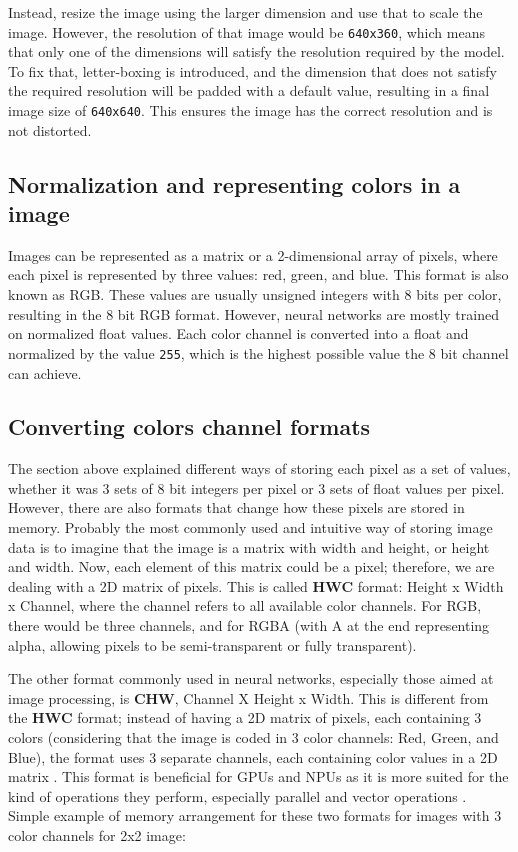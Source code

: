 Instead, resize the image using the larger dimension and use that to scale the image. However, the resolution of that image would be \texttt{640x360}, which means that only one of the dimensions will satisfy the resolution required by the model. To fix that, letter-boxing is introduced, and the dimension that does not satisfy the required resolution will be padded with a default value, resulting in a final image size of \texttt{640x640}. This ensures the image has the correct resolution and is not distorted.


\subsection{Normalization and representing colors in a image}
Images can be represented as a matrix or a 2-dimensional array of pixels, where each pixel is represented by three values: red, green, and blue. This format is also known as RGB. These values are usually unsigned integers with 8 bits per color, resulting in the 8 bit RGB format. However, neural networks are mostly trained on normalized float values. Each color channel is converted into a float and normalized by the value \texttt{255}, which is the highest possible value the 8 bit channel can achieve.


\subsection{Converting colors channel formats}
The section above explained different ways of storing each pixel as a set of values, whether it was 3 sets of 8 bit integers per pixel or 3 sets of float values per pixel. However, there are also formats that change how these pixels are stored in memory. Probably the most commonly used and intuitive way of storing image data is to imagine that the image is a matrix with width and height, or height and width. Now, each element of this matrix could be a pixel; therefore, we are dealing with a 2D matrix of pixels. This is called \textbf{HWC} format: Height x Width x Channel, where the channel refers to all available color channels. For RGB, there would be three channels, and for RGBA (with A at the end representing alpha, allowing pixels to be semi-transparent or fully transparent).

The other format commonly used in neural networks, especially those aimed at image processing, is \textbf{CHW}, Channel X Height x Width. This is different from the \textbf{HWC} format; instead of having a 2D matrix of pixels, each containing 3 colors (considering that the image is coded in 3 color channels: Red, Green, and Blue), the format uses 3 separate channels, each containing color values in a 2D matrix \cite{channelFormatsIntel} \cite{channelFormatsSynopsis}. This format is beneficial for GPUs and NPUs as it is more suited for the kind of operations  they perform, especially parallel and vector operations \cite{chwAndHwcFormats}. Simple example of memory arrangement for these two formats for images with 3 color channels for 2x2 image:

